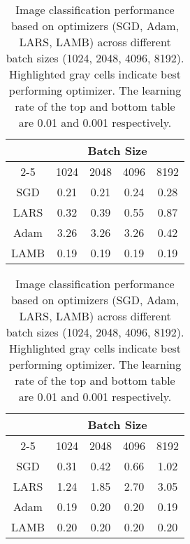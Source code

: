 \begin{table}[!b]
\vspace{-5pt}
\small
\vspace{7pt}
\caption{Image classification performance based on optimizers (SGD, Adam, LARS, LAMB) across different batch sizes (1024, 2048, 4096, 8192). Highlighted gray cells indicate best performing optimizer. The learning rate of the top and bottom table are 0.01 and 0.001 respectively.}\label{tbl:img_results}
\vspace{-10pt}
\begin{center}
\begin{tabular}{ c|c|c|c|c}
\multicolumn{1}{c|}{} &  \multicolumn{4}{c}{Batch Size}\\ \cline{2-5}
\multicolumn{1}{c|}{Optimizer} &
 \multicolumn{1}{c|}{1024} &
 \multicolumn{1}{c|}{2048} &
 \multicolumn{1}{c|}{4096} &
 \multicolumn{1}{c}{8192} \\
 \hline
SGD & 0.21 & 0.21 & 0.24 & 0.28 \\
LARS & 0.32 & 0.39 & 0.55 & 0.87 \\
Adam & 3.26 & 3.26 & 3.26 & 0.42 \\
LAMB & \cellcolor{gray!30} 0.19 & \cellcolor{gray!30} 0.19 & \cellcolor{gray!30} 0.19 & \cellcolor{gray!30}  0.19 \\

\end{tabular}

\vspace{10pt}

\begin{tabular}{ c|c|c|c|c}
\multicolumn{1}{c|}{} &  \multicolumn{4}{c}{Batch Size}\\ \cline{2-5}
\multicolumn{1}{c|}{Optimizer} &
 \multicolumn{1}{c|}{1024} &
 \multicolumn{1}{c|}{2048} &
 \multicolumn{1}{c|}{4096} &
 \multicolumn{1}{c}{8192} \\ \hline
SGD & 0.31 & 0.42 & 0.66 & 1.02 \\
LARS & 1.24 & 1.85 & 2.70 & 3.05 \\
Adam & \cellcolor{gray!30} 0.19 & \cellcolor{gray!30} 0.20 & \cellcolor{gray!30} 0.20 & \cellcolor{gray!30} 0.19 \\
LAMB & 0.20 & \cellcolor{gray!30} 0.20 & \cellcolor{gray!30} 0.20 & 0.20 \\

\end{tabular}
\vspace{-15pt}
\end{center}
\end{table}



